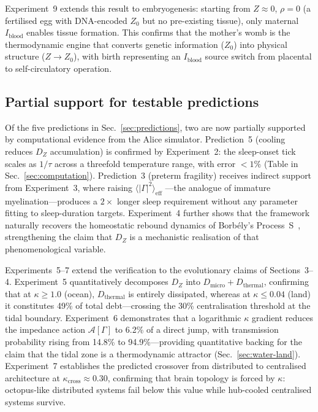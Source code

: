 ﻿\documentclass[aps,pre,twocolumn,superscriptaddress,floatfix]{revtex4-2}
\begin{document}
Experiment~9 extends this result to embryogenesis:
starting from $Z \approx 0$, $\rho = 0$ (a fertilised egg
with DNA-encoded $Z_0$ but no pre-existing tissue),
only maternal $I_{\mathrm{blood}}$ enables tissue formation.
This confirms that the mother's womb is the thermodynamic
engine that converts genetic information ($Z_0$) into
physical structure ($Z \to Z_0$), with birth representing
an $I_{\mathrm{blood}}$ source switch from placental to
self-circulatory operation.

\subsection{Partial support for testable predictions}

Of the five predictions in Sec.~\ref{sec:predictions},
two are now partially supported by computational evidence
from the Alice simulator.
Prediction~5 (cooling reduces $D_Z$ accumulation) is
confirmed by Experiment~2:
the sleep-onset tick scales as $1/\tau$ across a
threefold temperature range, with error $< 1\%$
(Table in Sec.~\ref{sec:computation}).
Prediction~3 (preterm fragility) receives indirect support
from Experiment~3, where raising
$\langle|\Gamma|^2\rangle_{\mathrm{eff}}$
---the analogue of immature myelination---produces
a $2\times$ longer sleep requirement without
any parameter fitting to sleep-duration targets.
Experiment~4 further shows that the framework
naturally recovers the homeostatic rebound dynamics
of Borb\'{e}ly's Process~S~\cite{Borbely1982},
strengthening the claim that $D_Z$ is a mechanistic
realisation of that phenomenological variable.

Experiments~5--7 extend the verification to the
evolutionary claims of Sections~3--4.
Experiment~5 quantitatively decomposes $D_Z$ into
$D_{\mathrm{micro}} + D_{\mathrm{thermal}}$,
confirming that at $\kappa \ge 1.0$ (ocean),
$D_{\mathrm{thermal}}$ is entirely dissipated,
whereas at $\kappa \le 0.04$ (land) it constitutes
49\% of total debt---crossing the 30\%
centralisation threshold at the tidal boundary.
Experiment~6 demonstrates that a logarithmic
$\kappa$ gradient reduces the impedance action
$\mathcal{A}[\Gamma]$ to 6.2\% of a direct jump,
with transmission probability rising from 14.8\%
to 94.9\%---providing quantitative backing for
the claim that the tidal zone is a thermodynamic
attractor (Sec.~\ref{sec:water-land}).
Experiment~7 establishes the predicted crossover
from distributed to centralised architecture
at $\kappa_{\mathrm{cross}} \approx 0.30$,
confirming that brain topology is forced by $\kappa$:
octopus-like distributed systems fail below this value
while hub-cooled centralised systems survive.
\end{document}
